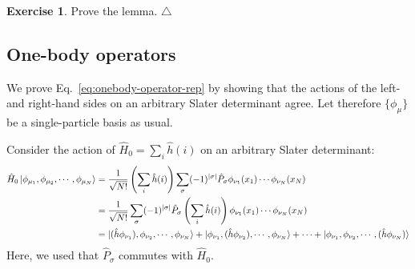 \documentclass{report}
\theoremstyle{plain}
\theoremstyle{definition}
\newtheorem{exerc}{Exercise}[chapter]
\newcommand\xqed[1]{%
  \leavevmode\unskip\penalty9999 \hbox{}\nobreak\hfill
  \quad\hbox{#1}}
\newcommand\demo{\xqed{$\triangle$}}
\newenvironment{exercise}{\bigskip\begin{exerc}}{\demo\end{exerc}\bigskip}
\begin{document}
\begin{exercise}
  Prove the lemma.
\end{exercise}

\subsection{One-body operators}

We prove Eq.~\eqref{eq:onebody-operator-rep} by showing that the
actions of the left- and right-hand sides on an arbitrary Slater
determinant agree. Let therefore
$\{\phi_\mu\}$ be a single-particle basis as usual.


Consider the action of $\hat{H}_0 = \sum_i \hat{h}(i)$ on an arbitrary
Slater determinant:
\begin{equation}
  \begin{split}
    \hat{H}_0 \ket{\phi_{\mu_1}, \phi_{\mu_2}, \cdots, \phi_{\mu_N}}
    &= \frac{1}{\sqrt{N!}} \left(\sum_i \hat{h}(i)\right) \sum_\sigma (-1)^{|\sigma|}
    \hat{P}_\sigma \phi_{\nu_1}(x_1)\cdots \phi_{\nu_N}(x_N) \\
    &= \frac{1}{\sqrt{N!}} \sum_\sigma (-1)^{|\sigma|}
    \hat{P}_\sigma \left(\sum_i \hat{h}(i)\right)
    \phi_{\nu_1}(x_1)\cdots \phi_{\nu_N}(x_N) \\
    & = \ket{(\hat{h}\phi_{\nu_1}), \phi_{\nu_2},\cdots,\phi_{\nu_N}}
    + \ket{\phi_{\nu_1}, (\hat{h}\phi_{\nu_2}),\cdots,\phi_{\nu_N}} +
    \cdots + \ket{\phi_{\nu_1},\phi_{\nu_2},\cdots,(\hat{h}\phi_{\nu_N})} 
\end{split}
\end{equation}
Here, we used that $\hat{P}_\sigma$ commutes with $\hat{H}_0$.
\end{document}
